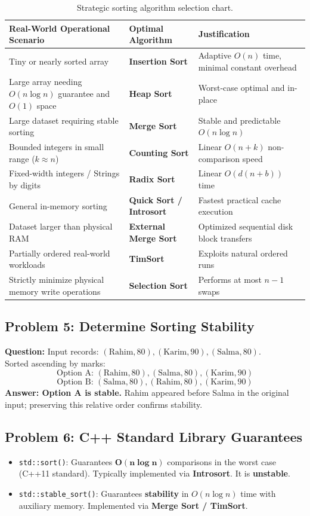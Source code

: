 \begin{table}[htbp]
\centering
\small
\begin{tabularx}{\textwidth}{p{6.5cm} p{3.5cm} X}
\toprule
\textbf{Real-World Operational Scenario} & \textbf{Optimal Algorithm} & \textbf{Justification} \\
\midrule
Tiny or nearly sorted array & \textbf{Insertion Sort} & Adaptive $O(n)$ time, minimal constant overhead \\
Large array needing $O(n \log n)$ guarantee and $O(1)$ space & \textbf{Heap Sort} & Worst-case optimal and in-place \\
Large dataset requiring stable sorting & \textbf{Merge Sort} & Stable and predictable $O(n \log n)$ \\
Bounded integers in small range ($k \approx n$) & \textbf{Counting Sort} & Linear $O(n + k)$ non-comparison speed \\
Fixed-width integers / Strings by digits & \textbf{Radix Sort} & Linear $O(d(n + b))$ time \\
General in-memory sorting & \textbf{Quick Sort / Introsort} & Fastest practical cache execution \\
Dataset larger than physical RAM & \textbf{External Merge Sort} & Optimized sequential disk block transfers \\
Partially ordered real-world workloads & \textbf{TimSort} & Exploits natural ordered runs \\
Strictly minimize physical memory write operations & \textbf{Selection Sort} & Performs at most $n - 1$ swaps \\
\bottomrule
\end{tabularx}
\caption{Strategic sorting algorithm selection chart.}
\end{table}

\subsection{Problem 5: Determine Sorting Stability}
\textbf{Question:} Input records: $(\text{Rahim}, 80), (\text{Karim}, 90), (\text{Salma}, 80)$.\\
Sorted ascending by marks:
\[
\text{Option A: } (\text{Rahim}, 80), (\text{Salma}, 80), (\text{Karim}, 90)
\]
\[
\text{Option B: } (\text{Salma}, 80), (\text{Rahim}, 80), (\text{Karim}, 90)
\]
\textbf{Answer: Option A is stable.} Rahim appeared before Salma in the original input; preserving this relative order confirms stability.

\subsection{Problem 6: C++ Standard Library Guarantees}
\begin{itemize}
    \item \texttt{std::sort()}: Guarantees $\mathbf{O(n \log n)}$ comparisons in the worst case (C++11 standard). Typically implemented via \textbf{Introsort}. It is \textbf{unstable}.
    \item \texttt{std::stable\_sort()}: Guarantees \textbf{stability} in $O(n \log n)$ time with auxiliary memory. Implemented via \textbf{Merge Sort / TimSort}.
\end{itemize}

